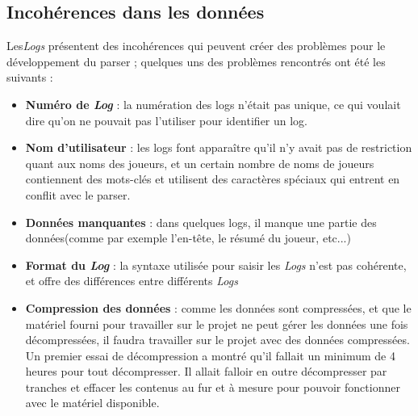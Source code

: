 \subsection{Incohérences dans les données}
Les\textit{Logs} présentent des incohérences qui peuvent créer des problèmes pour le développement du parser ; quelques uns des problèmes rencontrés ont été les suivants : 
\begin{itemize}
\item \textbf{Numéro de \textit{Log}} : la numération des logs n'était pas unique, ce qui voulait dire qu'on ne pouvait pas l'utiliser pour identifier un log.
\item \textbf{Nom d'utilisateur} : les logs font apparaître qu'il n'y avait pas de restriction quant aux noms des joueurs, et un certain nombre de noms de joueurs contiennent des mots-clés et utilisent des caractères spéciaux qui entrent en conflit avec le parser. 
\item \textbf{Données manquantes} : dans quelques logs, il manque une partie des données(comme par exemple l'en-tête, le résumé du joueur, etc...)
\item \textbf{Format du \textit{Log}} : la syntaxe utilisée pour saisir les \textit{Logs} n'est pas cohérente, et offre des différences entre différents \textit{Logs}
\item \textbf{Compression des données} : comme les données sont compressées, et que le matériel fourni pour travailler sur le projet ne peut gérer les données une fois décompressées, il faudra travailler sur le projet avec des données compressées. Un premier essai de décompression a montré qu'il fallait un minimum de 4 heures pour tout décompresser. Il allait falloir en outre décompresser par tranches et effacer les contenus au fur et à mesure pour pouvoir fonctionner avec le matériel disponible. 
\end{itemize}










